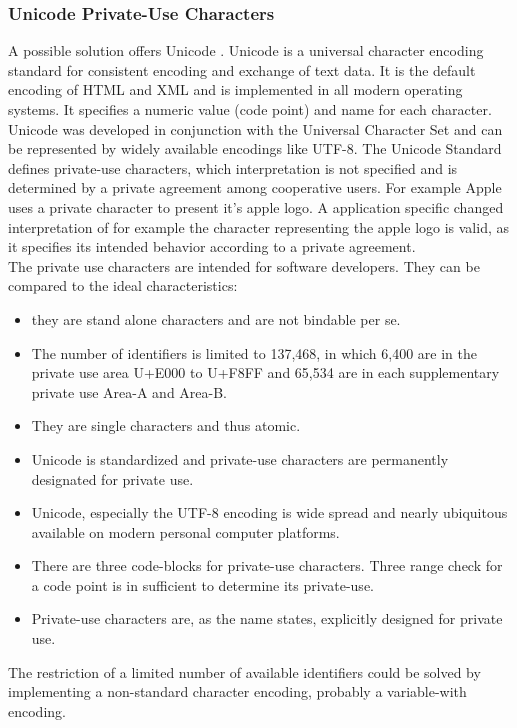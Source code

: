 \subsubsection{Unicode Private-Use Characters}
A possible solution offers Unicode \cite{Unicode}. Unicode is a universal character encoding standard for consistent encoding and exchange of text data. It is the default encoding of HTML and XML and is implemented in all modern operating systems. It specifies a numeric value (code point) and name for each character. Unicode was developed in conjunction with the Universal Character Set and can be represented by widely available encodings like UTF-8. The Unicode Standard defines private-use characters, which interpretation is not specified and is determined by a private agreement among cooperative users. For example Apple uses a private character to present it's apple logo. A application specific changed interpretation of for example the character representing the apple logo is valid, as it specifies its intended behavior according to a private agreement.\\
The private use characters are intended for software developers. They can be compared to the ideal characteristics:
\begin{itemize}
	\item they are stand alone characters and are not bindable per se.
	\item The number of identifiers is limited to 137,468, in which 6,400 are in the private use area U+E000 to U+F8FF and 65,534 are in each supplementary private use Area-A and Area-B. 
	\item They are single characters and thus atomic. 
	\item Unicode is standardized and private-use characters are permanently designated for private use.
	\item Unicode, especially the UTF-8 encoding is wide spread and nearly ubiquitous available on modern personal computer platforms.
	\item There are three code-blocks for private-use characters. Three range check for a code point is in sufficient to determine its private-use.
	\item Private-use characters are, as the name states, explicitly designed for private use.
\end{itemize}
The restriction of a limited number of available identifiers could be solved by implementing a non-standard character encoding, probably a variable-with encoding.



